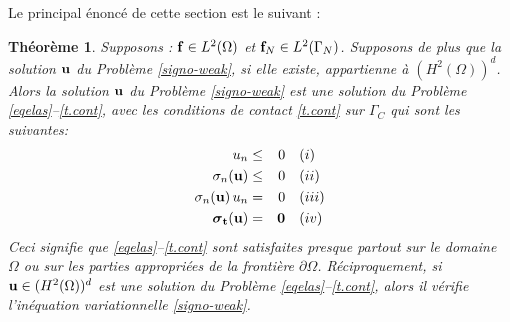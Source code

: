 \documentclass[11pt]{book}
\newtheorem{theorem}{Théorème}[section]
\newcommand{\bt}{\begin{theorem}}
\newcommand{\et}{\end{theorem}}
\def\u{{\bf u}}
\def\t{{\bf t}}
\def\f{{\bf f}}
\def\0{{\bf 0}}
\newcommand{\bs}{\mbox{\boldmath{$\sigma$}}}
\begin{document}
Le principal énoncé de cette section est le suivant :
\bt \label{strong-weak-theorem}
Supposons : $\f \in L^2(\Omega)$ et $\f_N \in L^2(\Gamma_N)$. Supposons de plus que la solution $\u$ du  Problème \eqref{signo-weak}, si elle existe, appartienne à $(H^2(\Omega))^d$. Alors la solution $\u$ du Problème \eqref{signo-weak} est une solution du Problème \eqref{eqelas}--\eqref{t.cont}, avec les conditions de contact \eqref{t.cont} sur $\Gamma_C$ qui sont les suivantes:
\begin{align}
\begin{aligned}
 u_n  &\le& 0 & \quad (i)\\ %
 \sigma_n(\u) &\le& 0 & \quad (ii)\\  %
 \sigma_n(\u)\, u_n &=& 0 & \quad (iii)\\ %
 \bs_\t(\u)  &=& \0 & \quad (iv)
\end{aligned}
\label{t.cont}
\end{align}
Ceci signifie que \eqref{eqelas}--\eqref{t.cont} sont satisfaites presque partout sur le domaine $\Omega$ ou sur les parties appropriées de la frontière $\partial \Omega$. Réciproquement, si $\u \in (H^2(\Omega))^d$ est une solution du Problème \eqref{eqelas}--\eqref{t.cont}, alors il vérifie l'inéquation variationnelle \eqref{signo-weak}.
\et
 
\end{document}
